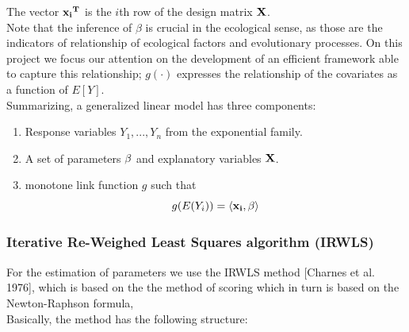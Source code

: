 The vector $\bf{x_i}^T$ is the $i$th row of the design matrix $\bf{X}$.\\

Note that the inference of $\beta$ is crucial in the ecological sense, as those are the indicators of relationship of ecological factors and evolutionary processes. On this project we focus our attention on the development of an efficient framework able to capture this relationship; $g(\cdot)$ expresses the relationship of the covariates as a function of $E[Y]$. \\


Summarizing, a generalized linear model has three components:

\begin{enumerate}
	\item Response variables $Y_1,...,Y_n$ from the exponential family.
	\item A set of parameters $\bf{\beta}$ and explanatory variables $\bf{X}$.
	\item monotone link function $g$ such that 	
		$$ g(E(Y_i))=\langle \bf{x}_i, \bf{\beta} \rangle $$
\end{enumerate}


\subsubsection{Iterative Re-Weighed Least Squares algorithm (IRWLS)}

For the estimation of parameters we use the IRWLS method [Charnes et al. 1976], which is based on the the method of scoring which in turn is based on the Newton-Raphson formula, \\

Basically, the method has the following structure:\\

 \vspace{1cm}


